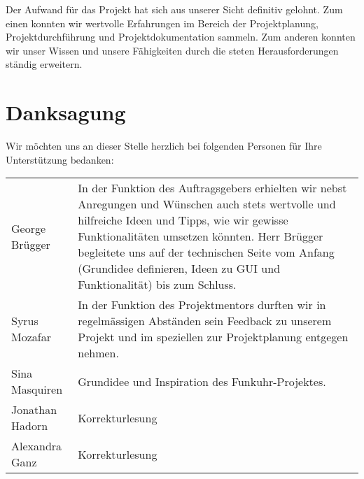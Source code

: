 Der Aufwand für das Projekt hat sich aus unserer Sicht definitiv gelohnt. Zum einen konnten wir wertvolle Erfahrungen im Bereich der Projektplanung, Projektdurchführung und Projektdokumentation sammeln. Zum anderen konnten wir unser Wissen und unsere Fähigkeiten durch die steten Herausforderungen ständig erweitern.

\section{Danksagung}
Wir möchten uns an dieser Stelle herzlich bei folgenden Personen für Ihre Unterstützung bedanken:\\
\vspace{0.5cm}

\begin{tabular}{p{3cm} p{10cm}}
George Brügger & In der Funktion des Auftragsgebers erhielten wir nebst Anregungen und Wünschen auch stets wertvolle und hilfreiche Ideen und Tipps, wie wir gewisse Funktionalitäten umsetzen könnten. Herr Brügger begleitete uns auf der technischen Seite vom Anfang (Grundidee definieren, Ideen zu GUI und Funktionalität) bis zum Schluss.\\
Syrus Mozafar & In der Funktion des Projektmentors durften wir in regelmässigen Abständen sein Feedback zu unserem Projekt und im speziellen zur Projektplanung entgegen nehmen.\\
Sina Masquiren & Grundidee und Inspiration des Funkuhr-Projektes.\\
Jonathan Hadorn & Korrekturlesung\\
Alexandra Ganz & Korrekturlesung\\
\end{tabular}
